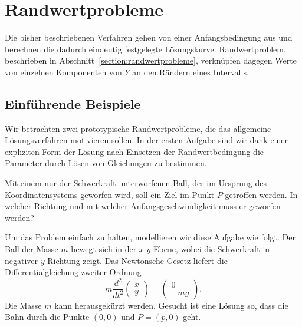 %
%
%
\section{Randwertprobleme\label{section:numerik:randwertprobleme}}
Die bisher beschriebenen Verfahren gehen von einer Anfangsbedingung
aus und berechnen die dadurch eindeutig festgelegte Lösungskurve.
Randwertproblem, beschrieben in Abschnitt~\ref{section:randwertprobleme},
verknüpfen dagegen Werte von einzelnen Komponenten von $Y$ an den
Rändern eines Intervalls.
%

\subsection{Einführende Beispiele}
Wir betrachten zwei prototypische Randwertprobleme, die das allgemeine
Lösungsverfahren motivieren sollen.
In der ersten Aufgabe sind wir dank einer expliziten Form der Lösung
nach Einsetzen der Randwertbedingung die Parameter durch Lösen
von Gleichungen zu bestimmen.

\begin{aufgabe}
\label{numerik:aufgabe-ball}
Mit einem nur der Schwerkraft unterworfenen Ball, der im Ursprung des
Koordinatensystems geworfen wird, soll ein Ziel im Punkt $P$ getroffen
werden.
%
%
In welcher Richtung und mit welcher Anfangsgeschwindigkeit muss er geworfen
werden?
%
\end{aufgabe}

Um das Problem einfach zu halten, modellieren wir diese Aufgabe wie
folgt.
Der Ball der Masse $m$ bewegt sich in der $x$-$y$-Ebene, wobei die
Schwerkraft in negativer $y$-Richtung zeigt.
%
%
Das Newtonsche Gesetz liefert die Differentialgleichung zweiter Ordnung
%
\begin{equation}
m\frac{d^2}{dt^2}\begin{pmatrix}x\\y\end{pmatrix}
=
\begin{pmatrix}
0\\-mg
\end{pmatrix}.
\label{numerik:ball-dgl}
\end{equation}
Die Masse $m$ kann herausgekürzt werden.
Gesucht ist eine Lösung so, dass die Bahn durch die Punkte $(0,0)$
und $P=(p,0)$ geht.
%

